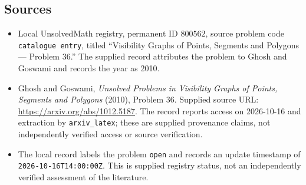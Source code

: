 \documentclass[11pt]{article}
\begin{document}
\subsection{Sources}
\begin{itemize}
\item Local UnsolvedMath registry, permanent ID \(800562\), source problem code \texttt{catalogue entry}, titled ``Visibility Graphs of Points, Segments and Polygons --- Problem 36.'' The supplied record attributes the problem to Ghosh and Goswami and records the year as 2010.
\item Ghosh and Goswami, \emph{Unsolved Problems in Visibility Graphs of Points, Segments and Polygons} (2010), Problem 36. Supplied source URL: \url{https://arxiv.org/abs/1012.5187}. The record reports access on 2026-10-16 and extraction by \texttt{arxiv\_latex}; these are supplied provenance claims, not independently verified access or source verification.
\item The local record labels the problem \texttt{open} and records an update timestamp of \texttt{2026-10-16T14:00:00Z}. This is supplied registry status, not an independently verified assessment of the literature.
\end{itemize}
\end{document}
